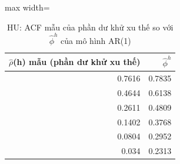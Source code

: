 \begin{table}[H]
\centering\small
\caption{HU: ACF mẫu của phần dư khử xu thế so với $\hat\phi^h$ của mô hình AR(1)}\label{tab:tab_b11_06_ar1_acf}
\begin{adjustbox}{max width=\linewidth}
\begin{tabular}{rr}
\toprule
$\hat{\rho}$(h) mẫu (phần dư khử xu thế) & $\hat{\phi}^{h}$ \\
\midrule
0.7616 & 0.7835 \\
0.4644 & 0.6138 \\
0.2611 & 0.4809 \\
0.1402 & 0.3768 \\
0.0804 & 0.2952 \\
0.034 & 0.2313 \\
\bottomrule
\end{tabular}
\end{adjustbox}
\end{table}
